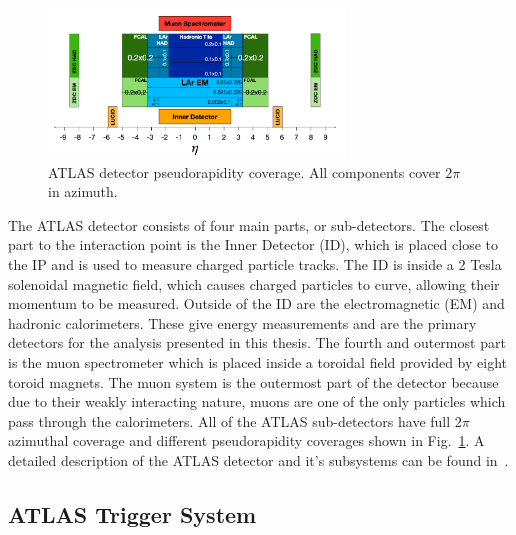 {\begin{figure}
	\centering
	\includegraphics[width=0.7\textwidth]{figures/atlaspseudorap.png} %
	\caption{ ATLAS detector pseudorapidity coverage. All components cover $2\pi$ in azimuth. }	
	\label{fig:atlasrap}%
\end{figure}

The ATLAS detector consists of four main parts, or sub-detectors. The closest part to the interaction point is the Inner Detector (ID), which is placed close to the IP and is used to measure charged particle tracks. The ID is inside a 2 Tesla solenoidal magnetic field, which causes charged particles to curve, allowing their momentum to be measured. Outside of the ID are the electromagnetic (EM) and hadronic calorimeters. These give energy measurements and are the primary detectors for the analysis presented in this thesis. The fourth and outermost part is the muon spectrometer which is placed inside a toroidal field provided by eight toroid magnets. The muon system is the outermost part of the detector because due to their weakly interacting nature, muons are one of the only particles which pass through the calorimeters. All of the ATLAS sub-detectors have full $2\pi$ azimuthal coverage and different pseudorapidity coverages shown in  Fig.~\ref{fig:atlasrap}. A detailed description of the ATLAS detector and it's subsystems can be found in~\cite{Aad:2008zzm}. 

\subsection{ATLAS Trigger System}
\label{sec:trigger}

}

